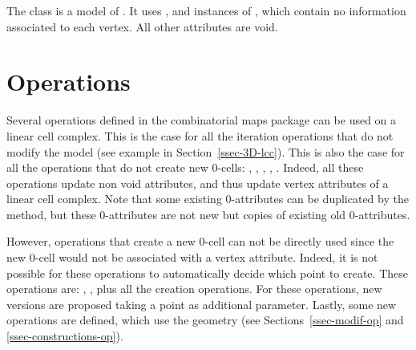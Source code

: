 The class  is a
model of . It uses ,
and instances of ,
which contain no information associated to each vertex. All other
attributes are void.  

\section{Operations}

Several operations defined in the combinatorial maps package can be
used on a linear cell complex. This is the case for all the iteration
operations that do not modify the model (see example in 
Section~\ref{ssec-3D-lcc}). This is also the case for
all the operations that do not create new 0-cells: ,
, , ,
.  Indeed, all these operations update
non void attributes, and thus update vertex attributes of a linear
cell complex. Note that some existing 0-attributes can be duplicated
by the  method, but these 0-attributes are not new but
copies of existing old 0-attributes.

However, operations that create a new 0-cell can not be directly used
since the new 0-cell would not be associated with a vertex
attribute. Indeed, it is not possible for these operations to
automatically decide which point to create. These operations are:
, 
, plus all the creation
operations. For these operations, new versions are proposed taking
a point as additional parameter.  Lastly, some new operations are
defined, which use the geometry (see Sections~\ref{ssec-modif-op} and
\ref{ssec-constructions-op}).



